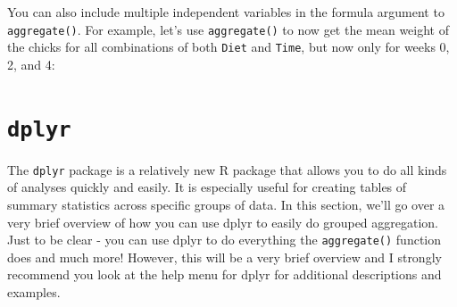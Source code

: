 \documentclass[]{book}
\newenvironment{Shaded}{\begin{snugshade}}{\end{snugshade}}
\newcommand{\KeywordTok}[1]{\textcolor[rgb]{0.13,0.29,0.53}{\textbf{{#1}}}}
\newcommand{\DataTypeTok}[1]{\textcolor[rgb]{0.13,0.29,0.53}{{#1}}}
\newcommand{\DecValTok}[1]{\textcolor[rgb]{0.00,0.00,0.81}{{#1}}}
\newcommand{\StringTok}[1]{\textcolor[rgb]{0.31,0.60,0.02}{{#1}}}
\newcommand{\CommentTok}[1]{\textcolor[rgb]{0.56,0.35,0.01}{\textit{{#1}}}}
\newcommand{\NormalTok}[1]{{#1}}
\theoremstyle{definition}
\theoremstyle{definition}
\theoremstyle{remark}
\begin{document}
You can also include multiple independent variables in the formula
argument to \texttt{aggregate()}. For example, let's use
\texttt{aggregate()} to now get the mean weight of the chicks for all
combinations of both \texttt{Diet} and \texttt{Time}, but now only for
weeks 0, 2, and 4:

\begin{Shaded}
\end{Shaded}

\section{\texorpdfstring{\texttt{dplyr}}{dplyr}}\label{dplyr}

The \texttt{dplyr} package is a relatively new R package that allows you
to do all kinds of analyses quickly and easily. It is especially useful
for creating tables of summary statistics across specific groups of
data. In this section, we'll go over a very brief overview of how you
can use dplyr to easily do grouped aggregation. Just to be clear - you
can use dplyr to do everything the \texttt{aggregate()} function does
and much more! However, this will be a very brief overview and I
strongly recommend you look at the help menu for dplyr for additional
descriptions and examples.
\end{document}
